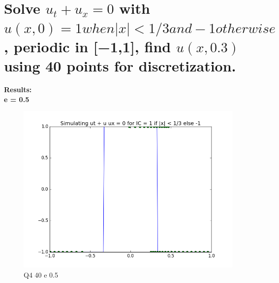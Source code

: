 \documentclass[a4paper,11pt]{article}
\begin{document}
\newpage
\indent\\
\newpage
\section{Solve $u_t+u_x=0$ with $u(x,0)= 1 when  |x|<1/3 and -1 otherwise$, periodic in [−1,1], find $u(x,0.3)$ using 40 points for discretization.\\}

\textbf{Results:}\\

\indent \textbf{e = 0.5}
\begin{figure}[ht]
    \centering
    \includegraphics[width=.8\linewidth]{q4_40_05.png}
    \caption{Q4 40 e 0.5}
    \label{fig:ex9}    
\end{figure}
\end{document}
